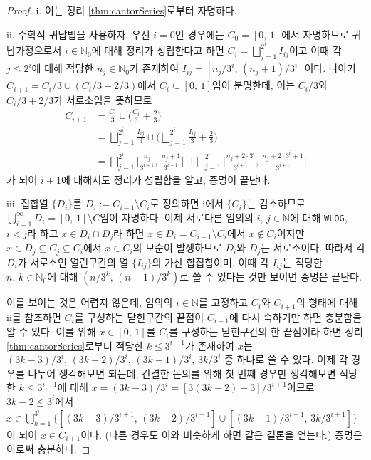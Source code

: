 \begin{proof}
    i. 이는 정리 \ref{thm:cantorSeries}로부터 자명하다.

    ii. 수학적 귀납법을 사용하자. 우선 $i=0$인 경우에는 $C_0=[0,\,1]$에서 자명하므로 귀납가정으로서 $i\in\mathbb{N}_0$에 대해 정리가 성립한다고 하면 $C_i=\bigsqcup_{j=1}^{2^i}I_{ij}$이고 이때 각 $j\leq 2^i$에 대해 적당한 $n_j\in\mathbb{N}_0$가 존재하여 $I_{ij}=[n_j/3^i,\,(n_j+1)/3^i]$이다. 나아가 $C_{i+1}=C_i/3\cup(C_i/3+2/3)$에서 $C_i\subseteq[0,\,1]$임이 분명한데, 이는 $C_i/3$와 $C_i/3+2/3$가 서로소임을 뜻하므로
    \begin{align*}
        C_{i+1}&=\frac{C_i}{3}\sqcup\bigg(\frac{C_i}{3}+\frac{2}{3}\bigg)\\
        &=\bigsqcup_{j=1}^{2^i}\frac{I_{ij}}{3}\sqcup\bigg(\bigsqcup_{j=1}^{2^i}\frac{I_{ij}}{3}+\frac{2}{3}\bigg)\\
        &=\bigsqcup_{j=1}^{2^i}\bigg[\frac{n_j}{3^{i+1}},\,\frac{n_j+1}{3^{i+1}}\bigg]\sqcup\bigsqcup_{j=1}^{2^i}\bigg[\frac{n_j+2\cdot3^i}{3^{i+1}},\,\frac{n_j+2\cdot3^i+1}{3^{i+1}}\bigg]
    \end{align*}
    가 되어 $i+1$에 대해서도 정리가 성립함을 알고, 증명이 끝난다.

    iii. 집합열 $\{D_i\}$를 $D_i:=C_{i-1}\setminus C_i$로 정의하면 i에서 $\{C_i\}$는 감소하므로 $\bigcup_{i=1}^\infty D_i=[0,\,1]\setminus C$임이 자명하다. 이제 서로다른 임의의 $i,\,j\in\mathbb{N}$에 대해 \texttt{WLOG}, $i<j$라 하고 $x\in D_i\cap D_j$라 하면 $x\in D_i=C_{i-1}\setminus C_i$에서 $x\notin C_i$이지만 $x\in D_j\subseteq C_j\subseteq C_i$에서 $x\in C_i$의 모순이 발생하므로 $D_i$와 $D_j$는 서로소이다. 따라서 각 $D_i$가 서로소인 열린구간의 열 $\{I_{ij}\}$의 가산 합집합이며, 이때 각 $I_{ij}$는 적당한 $n,\,k\in\mathbb{N}_0$에 대해 $(n/3^k,\,(n+1)/3^k)$로 쓸 수 있다는 것만 보이면 증명은 끝난다.

    이를 보이는 것은 어렵지 않은데, 임의의 $i\in\mathbb{N}$를 고정하고 $C_i$와 $C_{i+1}$의 형태에 대해 ii를 참조하면 $C_i$를 구성하는 닫힌구간의 끝점이 $C_{i+1}$에 다시 속하기만 하면 충분함을 알 수 있다. 이를 위해 $x\in[0,\,1]$를 $C_i$를 구성하는 닫힌구간의 한 끝점이라 하면 정리 \ref{thm:cantorSeries}로부터 적당한 $k\leq3^{i-1}$가 존재하여 $x$는 $(3k-3)/3^i,\,(3k-2)/3^i,\,(3k-1)/3^i,\,3k/3^i$ 중 하나로 쓸 수 있다. 이제 각 경우를 나누어 생각해보면 되는데, 간결한 논의를 위해 첫 번째 경우만 생각해보면 적당한 $k\leq3^{i-1}$에 대해 $x=(3k-3)/3^i=[3(3k-2)-3]/3^{i+1}$이므로 $3k-2\leq3^i$에서 $x\in\bigcup_{k=1}^{3^i}\{[(3k-3)/3^{i+1},\,(3k-2)/3^{i+1}]\cup[(3k-1)/3^{i+1},\,3k/3^{i+1}]\}$이 되어 $x\in C_{i+1}$이다. (다른 경우도 이와 비슷하게 하면 같은 결론을 얻는다.) 증명은 이로써 충분하다.
\end{proof}

